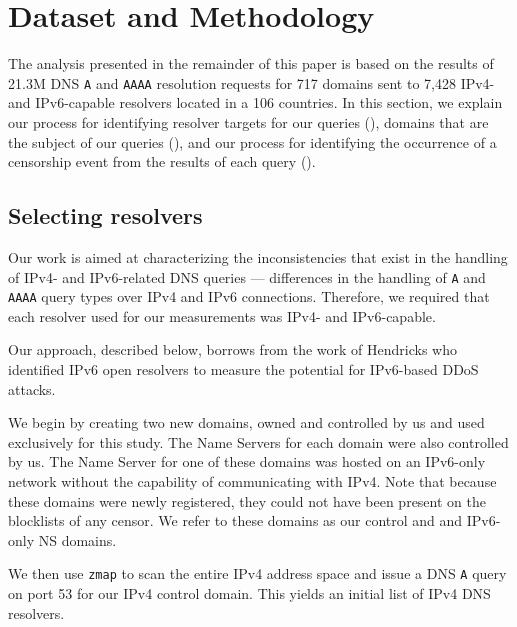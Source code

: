 \section{Dataset and Methodology}\label{sec:methodology}

The analysis presented in the remainder of this paper is based on the results
of 21.3M DNS {\tt A} and {\tt AAAA} resolution requests for 717 domains sent to
7,428 IPv4- and IPv6-capable resolvers located in a 106 countries.
%
In this section, we explain our process for identifying resolver targets for
our queries (), domains that are the subject of
our queries (), and our process for identifying
the occurrence of a censorship event from the results of each query
().

\subsection{Selecting resolvers} \label{sec:methodology:resolvers}
%
Our work is aimed at characterizing the inconsistencies that exist in the
handling of IPv4- and IPv6-related DNS queries --- \ie differences in the
handling of {\tt A} and {\tt AAAA} query types over IPv4 and IPv6
connections. Therefore, we required that each resolver used for our
measurements was IPv4- and IPv6-capable.
%

Our approach, described below, borrows from the work of Hendricks \etal
\cite{hendriks2017potential} who identified IPv6 open resolvers to measure the
potential for IPv6-based DDoS attacks.

We begin by creating two new domains, owned and controlled by us and used
exclusively for this study. The Name Servers for each domain were also
controlled by us. The Name Server for one of these domains was hosted on
an IPv6-only network without the capability of communicating with IPv4.
%
Note that because these domains were newly registered, they could not have been
present on the blocklists of any censor. We refer to these domains as our
{control and and IPv6-only NS domains}.
%

We then use {\tt zmap} \cite{Durumeric13zmap} to scan the entire IPv4 address
space and issue a DNS {\tt A} query on port 53 for our IPv4 control
domain. This yields an initial list of IPv4 DNS resolvers.
%

